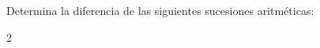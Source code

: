 Determina la diferencia de las siguientes sucesiones aritméticas:

                \begin{multicols}{2}
                \end{multicols}
            